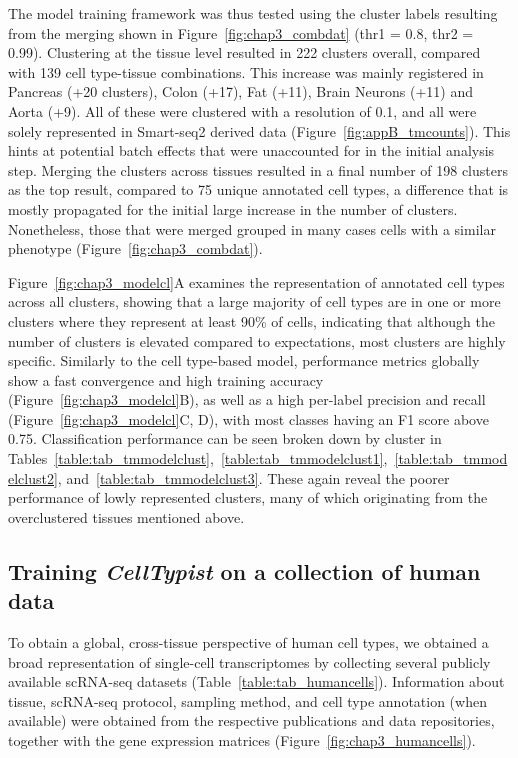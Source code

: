 The model training framework was thus tested using the cluster labels resulting from the merging shown in Figure~\ref{fig:chap3_combdat} (thr1 = 0.8, thr2 = 0.99). Clustering at the tissue level resulted in 222 clusters overall, compared with 139 cell type-tissue combinations. This increase was mainly registered in Pancreas (+20 clusters), Colon (+17), Fat (+11), Brain Neurons (+11) and Aorta (+9). All of these were clustered with a resolution of 0.1, and all were solely represented in Smart-seq2 derived data (Figure~\ref{fig:appB_tmcounts}). This hints at potential batch effects that were unaccounted for in the initial analysis step. Merging the clusters across tissues resulted in a final number of 198 clusters as the top result, compared to 75 unique annotated cell types, a difference that is mostly propagated for the initial large increase in the number of clusters. Nonetheless, those that were merged grouped in many cases cells with a similar phenotype (Figure~\ref{fig:chap3_combdat}).

Figure~\ref{fig:chap3_modelcl}A examines the representation of annotated cell types across all clusters, showing that a large majority of cell types are in one or more clusters where they represent at least 90\% of cells, indicating that although the number of clusters is elevated compared to expectations, most clusters are highly specific. Similarly to the cell type-based model, performance metrics globally show a fast convergence and high training accuracy (Figure~\ref{fig:chap3_modelcl}B), as well as a high per-label precision and recall (Figure~\ref{fig:chap3_modelcl}C, D), with most classes having an F1 score above 0.75. Classification performance can be seen broken down by cluster in Tables~\ref{table:tab_tmmodelclust},~\ref{table:tab_tmmodelclust1},~\ref{table:tab_tmmodelclust2}, and~\ref{table:tab_tmmodelclust3}. These again reveal the poorer performance of lowly represented clusters, many of which originating from the overclustered tissues mentioned above.


\subsection{Training \textit{CellTypist} on a collection of human data}
\label{section3.3_human}
To obtain a global, cross-tissue perspective of human cell types, we obtained a broad representation of single-cell transcriptomes by collecting several publicly available scRNA-seq datasets (Table~\ref{table:tab_humancells}). Information about tissue, scRNA-seq protocol, sampling method, and cell type annotation (when available) were obtained from the respective publications and data repositories, together with the gene expression matrices (Figure~\ref{fig:chap3_humancells}).

